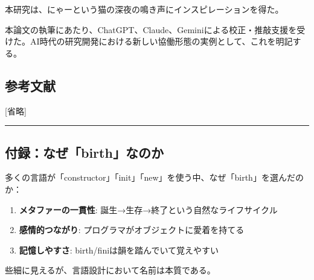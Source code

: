 \documentclass[
]{article}
\providecommand{\tightlist}{%
  \setlength{\itemsep}{0pt}\setlength{\parskip}{0pt}}
\begin{document}
本研究は、にゃーという猫の深夜の鳴き声にインスピレーションを得た。

本論文の執筆にあたり、ChatGPT、Claude、Geminiによる校正・推敲支援を受けた。AI時代の研究開発における新しい協働形態の実例として、これを明記する。

\hypertarget{ux53c2ux8003ux6587ux732e}{%
\subsection{参考文献}\label{ux53c2ux8003ux6587ux732e}}

{[}省略{]}

\begin{center}\rule{0.5\linewidth}{0.5pt}\end{center}

\hypertarget{ux4ed8ux9332ux306aux305cbirthux306aux306eux304b}{%
\subsection{付録：なぜ「birth」なのか}\label{ux4ed8ux9332ux306aux305cbirthux306aux306eux304b}}

多くの言語が「constructor」「init」「new」を使う中、なぜ「birth」を選んだのか：

\begin{enumerate}
\def\labelenumi{\arabic{enumi}.}
\tightlist
\item
  \textbf{メタファーの一貫性}: 誕生→生存→終了という自然なライフサイクル
\item
  \textbf{感情的つながり}: プログラマがオブジェクトに愛着を持てる
\item
  \textbf{記憶しやすさ}: birth/finiは韻を踏んでいて覚えやすい
\end{enumerate}

些細に見えるが、言語設計において名前は本質である。
\end{document}
